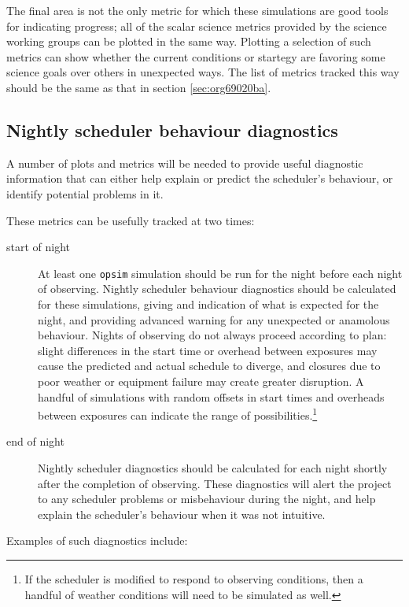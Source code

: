 The final area is not the only metric for which these simulations are good tools for indicating progress; all of the scalar science metrics provided by the science working groups can be plotted in the same way. Plotting a selection of such metrics can show whether the current conditions or startegy are favoring some science goals over others in unexpected ways.
The list of metrics tracked this way should be the same as that in section \ref{sec:org69020ba}.

\subsection{Nightly scheduler behaviour diagnostics}
\label{sec:orgbac0214}
A number of plots and metrics will be needed to provide useful diagnostic information that can either help explain or predict the scheduler's behaviour, or identify potential problems in it.

These metrics can be usefully tracked at two times:
\begin{description}
\item[{start of night}] At least one \texttt{opsim} simulation should be run for the night before each night of observing. Nightly scheduler behaviour diagnostics should be calculated for these simulations, giving and indication of what is expected for the night, and providing advanced warning for any unexpected or anamolous behaviour. Nights of observing do not always proceed according to plan: slight differences in the start time or overhead between exposures may cause the predicted and actual schedule to diverge, and closures due to poor weather or equipment failure may create greater disruption. A handful of simulations with random offsets in start times and overheads between exposures can indicate the range of possibilities.\footnote{If the scheduler is modified to respond to observing conditions, then a handful of weather conditions will need to be simulated as well.}
\item[{end of night}] Nightly scheduler diagnostics should be calculated for each night shortly after the completion of observing. These diagnostics will alert the project to any scheduler problems or misbehaviour during the night, and help explain the scheduler's behaviour when it was not intuitive.
\end{description}

Examples of such diagnostics include:

